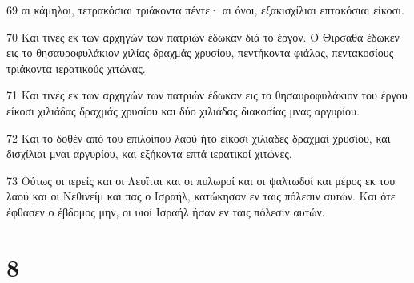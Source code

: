 \par 69 αι κάμηλοι, τετρακόσιαι τριάκοντα πέντε· αι όνοι, εξακισχίλιαι επτακόσιαι είκοσι.
\par 70 Και τινές εκ των αρχηγών των πατριών έδωκαν διά το έργον. Ο Θιρσαθά έδωκεν εις το θησαυροφυλάκιον χιλίας δραχμάς χρυσίου, πεντήκοντα φιάλας, πεντακοσίους τριάκοντα ιερατικούς χιτώνας.
\par 71 Και τινές εκ των αρχηγών των πατριών έδωκαν εις το θησαυροφυλάκιον του έργου είκοσι χιλιάδας δραχμάς χρυσίου και δύο χιλιάδας διακοσίας μνας αργυρίου.
\par 72 Και το δοθέν από του επιλοίπου λαού ήτο είκοσι χιλιάδες δραχμαί χρυσίου, και δισχίλιαι μναι αργυρίου, και εξήκοντα επτά ιερατικοί χιτώνες.
\par 73 Ούτως οι ιερείς και οι Λευΐται και οι πυλωροί και οι ψαλτωδοί και μέρος εκ του λαού και οι Νεθινείμ και πας ο Ισραήλ, κατώκησαν εν ταις πόλεσιν αυτών. Και ότε έφθασεν ο έβδομος μην, οι υιοί Ισραήλ ήσαν εν ταις πόλεσιν αυτών.

\chapter{8}

